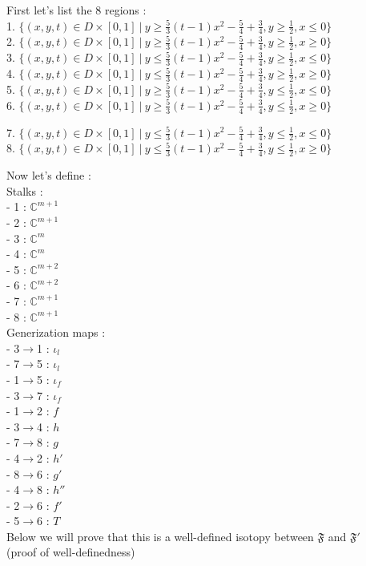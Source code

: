 First let's list the 8 regions :\\

1. $\{(x,y,t)\in D\times [0,1]~|~ y \geq \frac{5}{3}(t-1)x^2 - \frac{5}{4} + \frac{3}{4}, y \geq \frac{1}{2}, x\leq 0\}$\\

2. $\{(x,y,t)\in D\times [0,1]~|~ y \geq \frac{5}{3}(t-1)x^2 - \frac{5}{4} + \frac{3}{4}, y \geq \frac{1}{2}, x\geq 0\}$\\

3. $\{(x,y,t)\in D\times [0,1]~|~ y \leq \frac{5}{3}(t-1)x^2 - \frac{5}{4} + \frac{3}{4}, y \geq \frac{1}{2}, x\leq 0\}$\\

4. $\{(x,y,t)\in D\times [0,1]~|~ y \leq \frac{5}{3}(t-1)x^2 - \frac{5}{4} + \frac{3}{4}, y \geq \frac{1}{2}, x\geq 0\}$\\

5. $\{(x,y,t)\in D\times [0,1]~|~ y \geq \frac{5}{3}(t-1)x^2 - \frac{5}{4} + \frac{3}{4}, y \leq \frac{1}{2}, x\leq 0\}$\\

6. $\{(x,y,t)\in D\times [0,1]~|~ y \geq \frac{5}{3}(t-1)x^2 - \frac{5}{4} + \frac{3}{4}, y \leq \frac{1}{2}, x\geq 0\}$

7. $\{(x,y,t)\in D\times [0,1]~|~ y \leq \frac{5}{3}(t-1)x^2 - \frac{5}{4} + \frac{3}{4}, y \leq \frac{1}{2}, x\leq 0\}$\\

8. $\{(x,y,t)\in D\times [0,1]~|~ y \leq \frac{5}{3}(t-1)x^2 - \frac{5}{4} + \frac{3}{4}, y \leq \frac{1}{2}, x\geq 0\}$

Now let's define :\\

Stalks :\\

- 1 : $\mathbb{C}^{m+1}$\\
- 2 : $\mathbb{C}^{m+1}$\\
- 3 : $\mathbb{C}^{m}$\\
- 4 : $\mathbb{C}^{m}$\\
- 5 : $\mathbb{C}^{m+2}$\\
- 6 : $\mathbb{C}^{m+2}$\\
- 7 : $\mathbb{C}^{m+1}$\\
- 8 : $\mathbb{C}^{m+1}$\\

Generization maps : \\

- 3$\rightarrow$1 : $\iota_l$\\
- 7$\rightarrow$5 : $\iota_l$\\
- 1$\rightarrow$5 : $\iota_f$\\
- 3$\rightarrow$7 : $\iota_f$\\
- 1$\rightarrow$2 : $f$\\
- 3$\rightarrow$4 : $h$\\
- 7$\rightarrow$8 : $g$\\
- 4$\rightarrow$2 : $h'$\\
- 8$\rightarrow$6 : $g'$\\
- 4$\rightarrow$8 : $h''$\\
- 2$\rightarrow$6 : $f'$\\
- 5$\rightarrow$6 : $T$\\

Below we will prove that this is a well-defined isotopy between $\mathfrak{F}$ and $\mathfrak{F}'$\\

(proof of well-definedness)